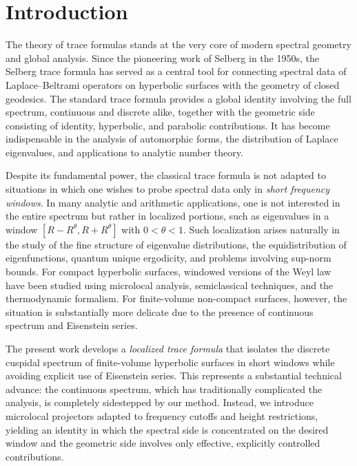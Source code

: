 \section{Introduction}\label{sec:intro}

The theory of trace formulas stands at the very core of modern spectral geometry and global analysis. 
Since the pioneering work of Selberg in the 1950s, the Selberg trace formula has served as a central tool for connecting spectral data of Laplace--Beltrami operators on hyperbolic surfaces with the geometry of closed geodesics. 
The standard trace formula provides a global identity involving the full spectrum, continuous and discrete alike, together with the geometric side consisting of identity, hyperbolic, and parabolic contributions. 
It has become indispensable in the analysis of automorphic forms, the distribution of Laplace eigenvalues, and applications to analytic number theory.

Despite its fundamental power, the classical trace formula is not adapted to situations in which one wishes to probe spectral data only in \emph{short frequency windows}. 
In many analytic and arithmetic applications, one is not interested in the entire spectrum but rather in localized portions, such as eigenvalues in a window $[R-R^{\theta},R+R^{\theta}]$ with $0<\theta<1$. 
Such localization arises naturally in the study of the fine structure of eigenvalue distributions, the equidistribution of eigenfunctions, quantum unique ergodicity, and problems involving sup-norm bounds. 
For compact hyperbolic surfaces, windowed versions of the Weyl law have been studied using microlocal analysis, semiclassical techniques, and the thermodynamic formalism. 
For finite-volume non-compact surfaces, however, the situation is substantially more delicate due to the presence of continuous spectrum and Eisenstein series.

The present work develops a \emph{localized trace formula} that isolates the discrete cuspidal spectrum of finite-volume hyperbolic surfaces in short windows while avoiding explicit use of Eisenstein series. 
This represents a substantial technical advance: the continuous spectrum, which has traditionally complicated the analysis, is completely sidestepped by our method. 
Instead, we introduce microlocal projectors adapted to frequency cutoffs and height restrictions, yielding an identity in which the spectral side is concentrated on the desired window and the geometric side involves only effective, explicitly controlled contributions.

